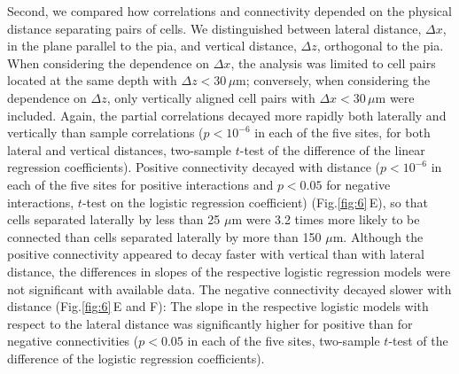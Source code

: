 \documentclass[10pt]{article}
\newcommand{\figref}[2]{Fig.\;\ref{fig:#1}\,#2}
\begin{document}
Second, we compared how correlations and connectivity depended on the physical distance separating pairs of cells. We distinguished between lateral distance, $\Delta x$, in the plane parallel to the pia, and vertical distance, $\Delta z$, orthogonal to the pia.  When considering the dependence on $\Delta x$, the analysis was limited to cell pairs located at the same depth with $\Delta z < 30\,\mu\mbox{m}$; conversely, when considering the dependence on $\Delta z$, only vertically aligned cell pairs with $\Delta x < 30\,\mu\mbox{m}$ were included. Again, the partial correlations decayed more rapidly both laterally and vertically than sample correlations ($p<10^{-6}$ in each of the five sites, for both lateral and vertical distances, two-sample $t$-test of the difference of the linear regression coefficients). 
Positive connectivity decayed with distance ($p<10^{-6}$ in each of the five sites for positive interactions and $p<0.05$ for negative interactions, $t$-test on the logistic regression coefficient) (\figref{6}{E}), so that cells separated laterally by less than 25 $\mu\mbox{m}$ were 3.2 times more likely to be connected than cells separated laterally by more than 150 $\mu\mbox{m}$. Although the positive connectivity appeared to decay faster with vertical than with lateral distance, the differences in slopes of the respective logistic regression models were not significant with available data. The negative connectivity decayed slower with distance (\figref{6}{E and F}): The slope in the respective logistic models with respect to the lateral distance was significantly higher for positive than for negative connectivities ($p<0.05$ in each of the five sites, two-sample $t$-test of the difference of the logistic regression coefficients). 
\end{document}

